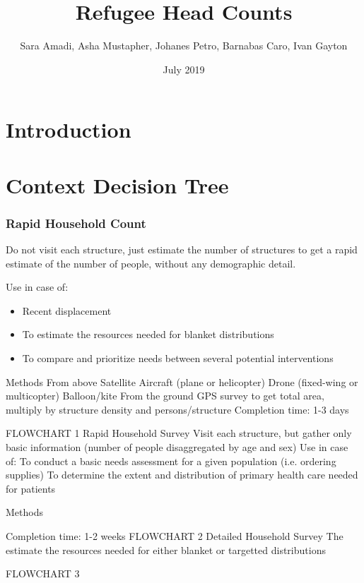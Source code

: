 \documentclass{article}
\title{Refugee Head Counts}
\author{Sara Amadi, Asha Mustapher, Johanes Petro, Barnabas Caro, Ivan Gayton }
\date{July 2019}
\begin{document}
\maketitle

\section{Introduction}

\section{Context Decision Tree}

\subsubsection{Rapid Household Count}
Do not visit each structure, just estimate the number of structures to get a rapid estimate of the number of people, without any demographic detail.

Use in case of:

\begin{itemize}
  \item Recent displacement
  \item To estimate the resources needed for blanket distributions
  \item To compare and prioritize needs between several potential interventions
\end{itemize}
Methods
From above
Satellite 
Aircraft (plane or helicopter)
Drone (fixed-wing or multicopter)
Balloon/kite
From the ground
GPS survey to get total area, multiply by structure density and persons/structure
Completion time: 1-3 days

FLOWCHART 1
Rapid Household Survey
Visit each structure, but gather only basic information (number of people disaggregated by age and sex)
Use in case of:
To conduct a basic needs assessment for a given population (i.e. ordering supplies)
To determine the extent and distribution of primary health care needed for patients


Methods

Completion time: 1-2 weeks
FLOWCHART 2
Detailed Household Survey
The estimate the resources needed for either blanket or targetted distributions


FLOWCHART 3
\end{document}

